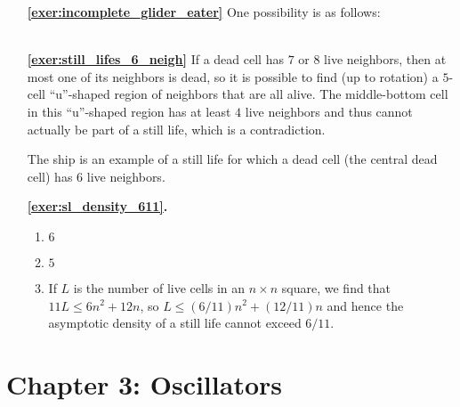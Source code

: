 \begin{multicols}{2}
\begin{itemize}[leftmargin=0em]
\begin{enumerate}[leftmargin=1.5em,label=(\alph*),resume=solu_fast_glider_eater]
			\item {} \\
		\end{enumerate}
	
	
	\item[\bf\color{ocre}\sffamily\ref{exer:incomplete_glider_eater}] One possibility is as follows: \\[-0.6em]
	
	 \\
	
	
	\item[\bf\color{ocre}\sffamily\ref{exer:still_lifes_6_neigh}] If a dead cell has $7$ or $8$ live neighbors, then at most one of its neighbors is dead, so it is possible to find (up to rotation) a $5$-cell ``u''-shaped region of neighbors that are all alive. The middle-bottom cell in this ``u''-shaped region has at least $4$ live neighbors and thus cannot actually be part of a still life, which is a contradiction.
	
	The ship is an example of a still life for which a dead cell (the central dead cell) has $6$ live neighbors. \\
	
	
	\item[\bf\color{ocre}\sffamily\ref{exer:sl_density_611}.] \begin{enumerate}[leftmargin=1.5em,label=\bf\color{ocre}(\alph*)]
		\item $6$
		
		\item $5$
		
		\item If $L$ is the number of live cells in an $n \times n$ square, we find that $11L \leq 6n^2 + 12n$, so $L \leq (6/11)n^2 + (12/11)n$ and hence the asymptotic density of a still life cannot exceed $6/11$. \\
	\end{enumerate}
\end{itemize}
\end{multicols}


\hypertarget{solutions_oscillators}{}\label{solutions_oscillators}
\section*{Chapter 3: Oscillators}
\renewcommand{\chapterfolder}{oscillators/}

